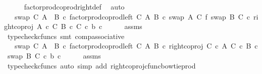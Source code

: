 \begin{isabellebody}
\ \ \ \ \isamarkupfalse%
\ factor{\isacharunderscore}{\kern0pt}prod{\isacharunderscore}{\kern0pt}coprod{\isacharunderscore}{\kern0pt}right{\isacharunderscore}{\kern0pt}def\ \isamarkupfalse%
\ auto\isanewline
\ \ \isamarkupfalse%
\ \isamarkupfalse%
\ {\isachardoublequoteopen}{\isachardot}{\kern0pt}{\isachardot}{\kern0pt}{\isachardot}{\kern0pt}\ {\isacharequal}{\kern0pt}\ swap\ C\ {\isacharparenleft}{\kern0pt}A\ {\isasymCoprod}\ B{\isacharparenright}{\kern0pt}\ {\isasymcirc}\isactrlsub c\ factor{\isacharunderscore}{\kern0pt}prod{\isacharunderscore}{\kern0pt}coprod{\isacharunderscore}{\kern0pt}left\ C\ A\ B\ {\isasymcirc}\isactrlsub c\ {\isacharparenleft}{\kern0pt}{\isacharparenleft}{\kern0pt}swap\ A\ C\ {\isasymbowtie}\isactrlsub f\ swap\ B\ C{\isacharparenright}{\kern0pt}\ {\isasymcirc}\isactrlsub c\ right{\isacharunderscore}{\kern0pt}coproj\ {\isacharparenleft}{\kern0pt}A\ {\isasymtimes}\isactrlsub c\ C{\isacharparenright}{\kern0pt}\ {\isacharparenleft}{\kern0pt}B\ {\isasymtimes}\isactrlsub c\ C{\isacharparenright}{\kern0pt}{\isacharparenright}{\kern0pt}\ {\isasymcirc}\isactrlsub c\ {\isasymlangle}b{\isacharcomma}{\kern0pt}\ c{\isasymrangle}{\isachardoublequoteclose}\isanewline
\ \ \ \ \isamarkupfalse%
\ assms\ \isamarkupfalse%
\ {\isacharparenleft}{\kern0pt}typecheck{\isacharunderscore}{\kern0pt}cfuncs{\isacharcomma}{\kern0pt}\ smt\ comp{\isacharunderscore}{\kern0pt}associative{}{\isacharparenright}{\kern0pt}\isanewline
\ \ \isamarkupfalse%
\ \isamarkupfalse%
\ {\isachardoublequoteopen}{\isachardot}{\kern0pt}{\isachardot}{\kern0pt}{\isachardot}{\kern0pt}\ {\isacharequal}{\kern0pt}\ swap\ C\ {\isacharparenleft}{\kern0pt}A\ {\isasymCoprod}\ B{\isacharparenright}{\kern0pt}\ {\isasymcirc}\isactrlsub c\ factor{\isacharunderscore}{\kern0pt}prod{\isacharunderscore}{\kern0pt}coprod{\isacharunderscore}{\kern0pt}left\ C\ A\ B\ {\isasymcirc}\isactrlsub c\ {\isacharparenleft}{\kern0pt}right{\isacharunderscore}{\kern0pt}coproj\ {\isacharparenleft}{\kern0pt}C\ {\isasymtimes}\isactrlsub c\ A{\isacharparenright}{\kern0pt}\ {\isacharparenleft}{\kern0pt}C\ {\isasymtimes}\isactrlsub c\ B{\isacharparenright}{\kern0pt}\ {\isasymcirc}\isactrlsub c\ swap\ B\ C{\isacharparenright}{\kern0pt}\ {\isasymcirc}\isactrlsub c\ {\isasymlangle}b{\isacharcomma}{\kern0pt}\ c{\isasymrangle}{\isachardoublequoteclose}\isanewline
\ \ \ \ \isamarkupfalse%
\ assms\ \isamarkupfalse%
\ {\isacharparenleft}{\kern0pt}typecheck{\isacharunderscore}{\kern0pt}cfuncs{\isacharcomma}{\kern0pt}\ auto\ simp\ add{\isacharcolon}{\kern0pt}\ right{\isacharunderscore}{\kern0pt}coproj{\isacharunderscore}{\kern0pt}cfunc{\isacharunderscore}{\kern0pt}bowtie{\isacharunderscore}{\kern0pt}prod{\isacharparenright}{\kern0pt}\isanewline

\end{isabellebody}
